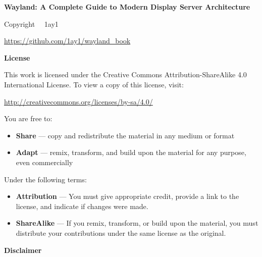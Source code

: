 
\thispagestyle{empty}

\vspace*{5cm}

\noindent
{\Large\bfseries Wayland: A Complete Guide to Modern Display Server Architecture}

\vspace{0.5cm}

\noindent
Copyright \textcopyright\ \the\year\ 1ay1

\vspace{0.3cm}

\noindent
\url{https://github.com/1ay1/wayland_book}

\vspace{1cm}

\noindent
\textbf{License}

\vspace{0.5cm}

\noindent
This work is licensed under the Creative Commons Attribution-ShareAlike 4.0 International License. To view a copy of this license, visit:

\url{http://creativecommons.org/licenses/by-sa/4.0/}

\vspace{0.5cm}

\noindent
You are free to:
\begin{itemize}
    \item \textbf{Share} --- copy and redistribute the material in any medium or format
    \item \textbf{Adapt} --- remix, transform, and build upon the material for any purpose, even commercially
\end{itemize}

\noindent
Under the following terms:
\begin{itemize}
    \item \textbf{Attribution} --- You must give appropriate credit, provide a link to the license, and indicate if changes were made.
    \item \textbf{ShareAlike} --- If you remix, transform, or build upon the material, you must distribute your contributions under the same license as the original.
\end{itemize}

\vspace{1cm}

\noindent
\textbf{Disclaimer}

\vspace{0.5cm}

